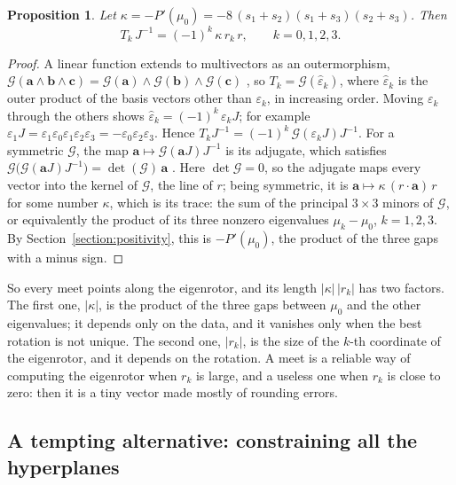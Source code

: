 \documentclass{birkjour}
\newtheorem{prop}[thm]{Proposition}
\theoremstyle{definition}
\theoremstyle{remark}
\numberwithin{equation}{section}
\newcommand{\Gop}{\mathcal{G}}
\begin{document}
\begin{prop}
\label{prop:meets}
Let $\kappa = -P'(\mu_0) = -8\, (s_1 + s_2)(s_1 + s_3)(s_2 + s_3)$. Then
\begin{equation}
\label{eqn:meets}
T_k\, J^{-1} = (-1)^k\, \kappa\, r_k\, r, \qquad k = 0, 1, 2, 3.
\end{equation}
\end{prop}
\begin{proof}
A linear function extends to multivectors as an outermorphism, $\Gop(\mathbf a \wedge \mathbf b \wedge \mathbf c) = \Gop(\mathbf a) \wedge \Gop(\mathbf b) \wedge \Gop(\mathbf c)$ \cite{HestenesSobczyk1984}, so $T_k = \Gop(\hat \varepsilon_k)$, where $\hat \varepsilon_k$ is the outer product of the basis vectors other than $\varepsilon_k$, in increasing order. Moving $\varepsilon_k$ through the others shows $\hat \varepsilon_k = (-1)^k\, \varepsilon_k J$; for example $\varepsilon_1 J = \varepsilon_1 \varepsilon_0 \varepsilon_1 \varepsilon_2 \varepsilon_3 = -\varepsilon_0 \varepsilon_2 \varepsilon_3$. Hence $T_k J^{-1} = (-1)^k\, \Gop(\varepsilon_k J) J^{-1}$. For a symmetric $\Gop$, the map $\mathbf a \mapsto \Gop(\mathbf a J) J^{-1}$ is its adjugate, which satisfies $\Gop\big(\Gop(\mathbf a J) J^{-1}\big) = \det(\Gop)\, \mathbf a$ \cite{HestenesSobczyk1984, Doran2003}. Here $\det \Gop = 0$, so the adjugate maps every vector into the kernel of $\Gop$, the line of $r$; being symmetric, it is $\mathbf a \mapsto \kappa\, (r \cdot \mathbf a)\, r$ for some number $\kappa$, which is its trace: the sum of the principal $3 \times 3$ minors of $\Gop$, or equivalently the product of its three nonzero eigenvalues $\mu_k - \mu_0$, $k = 1, 2, 3$. By Section~\ref{section:positivity}, this is $-P'(\mu_0)$, the product of the three gaps with a minus sign.
\end{proof}

So every meet points along the eigenrotor, and its length $|\kappa|\, |r_k|$ has two factors. The first one, $|\kappa|$, is the product of the three gaps between $\mu_0$ and the other eigenvalues; it depends only on the data, and it vanishes only when the best rotation is not unique. The second one, $|r_k|$, is the size of the $k$-th coordinate of the eigenrotor, and it depends on the rotation. A meet is a reliable way of computing the eigenrotor when $r_k$ is large, and a useless one when $r_k$ is close to zero: then it is a tiny vector made mostly of rounding errors.

\subsection{A tempting alternative: constraining all the hyperplanes}
\label{section:sum_of_meets}
\end{document}
